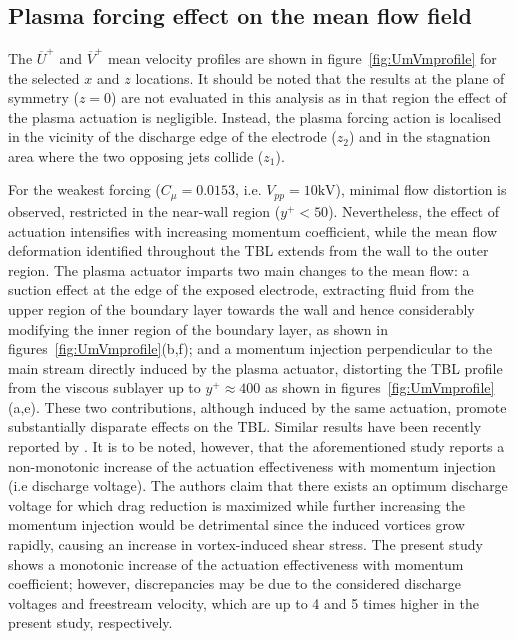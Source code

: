\subsection{Plasma forcing effect on the mean flow field \label{ss:meanTBL}}
The $\overline{U}^+$ and $\overline{V}^+$ mean velocity profiles are shown in figure~\ref{fig:UmVmprofile} for the selected $x$ and $z$ locations. It should be noted that the results at the plane of symmetry ($z=0$) are not evaluated in this analysis as in that region the effect of the plasma actuation is negligible. Instead, the plasma forcing action is localised in the vicinity of the discharge edge of the electrode ($z_2$) and in the stagnation area where the two opposing jets collide ($z_1$). 

For the weakest forcing ($C_\mu = 0.0153$, i.e.  $V_{pp}=10\mathrm{kV}$), minimal flow distortion is observed, restricted in the near-wall region ($y^+<50$). Nevertheless, the effect of actuation intensifies with increasing momentum coefficient, while the mean flow deformation identified throughout the TBL extends from the wall to the outer region. The plasma actuator imparts two main changes to the mean flow: a suction effect at the edge of the exposed electrode, extracting fluid from the upper region of the boundary layer towards the wall and hence considerably modifying the inner region of the boundary layer, as shown in figures~\ref{fig:UmVmprofile}(b,f); and a momentum injection perpendicular to the main stream directly induced by the plasma actuator, distorting the TBL profile from the viscous sublayer up to $y^+\approx 400$ as shown in figures~\ref{fig:UmVmprofile}(a,e). These two contributions, although induced by the same actuation, promote substantially disparate effects on the TBL. Similar results have been recently reported by \citet{cheng_wong_hussain_schroder_zhou_2021}. It is to be noted, however, that the aforementioned study reports a non-monotonic increase of the actuation effectiveness with momentum injection (i.e discharge voltage). The authors claim that there exists an optimum discharge voltage for which drag reduction is maximized while further increasing the momentum injection would be detrimental since the induced vortices grow rapidly, causing an increase in vortex-induced shear stress. The present study shows a monotonic increase of the actuation effectiveness with momentum coefficient; however, discrepancies may be due to the considered discharge voltages and freestream velocity, which are up to 4 and 5 times higher in the present study, respectively. 

